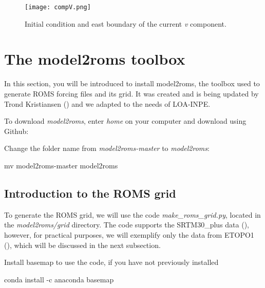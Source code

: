     
    
    \begin{figure} [!htb] 
    \centering
    \texttt{[image: compV.png]}
    \caption{Initial condition and east boundary of the current \textit{v} component.}
    \label{hycomantartic4}
    \end{figure}
\bigskip

\section{The model2roms toolbox}\label{model2romssec}
\bigskip

\noindent In this section, you will be introduced to install model2roms, the toolbox used to generate ROMS forcing files and its grid. 
It was created and is being updated by Trond Kristiansen (\textcolor{bleu_cite}{\cite{Trond2019}}) and we adapted to the needs of 
LOA-INPE. 
\bigskip

\noindent To download \textit{model2roms}, enter \textit{home} on your computer and download using Github:
\bigskip

\bigskip

\noindent Change the folder name from \textit{model2roms-master} to \textit{model2roms}:
\bigskip

\begin{bashcode}
mv model2roms-master model2roms
\end{bashcode}
\bigskip

\subsection{Introduction to the ROMS grid}
\bigskip

\noindent To generate the ROMS grid, we will use the code \textit{make\_roms\_grid.py}, located in the \textit{model2roms/grid} 
directory. The code supports the SRTM30\_plus data (\cite{Becker2009}), however, for practical purposes, we will exemplify 
only the data from ETOPO1 (\cite{Amante2009}), which will be discussed in the next subsection.
\bigskip

\noindent Install basemap to use the code, if you have not previously installed
\bigskip

\begin{bashcode}
conda install -c anaconda basemap
\end{bashcode}
\bigskip


